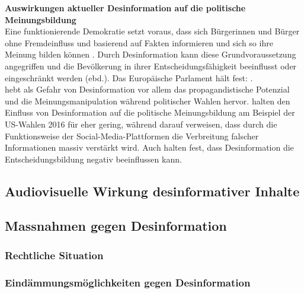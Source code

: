 \documentclass[12pt,a4paper]{article}        %
\begin{document}
\textbf{Auswirkungen aktueller Desinformation auf die politische Meinungsbildung}\\
Eine funktionierende Demokratie setzt voraus, dass sich Bürgerinnen und Bürger ohne Fremdeinfluss und basierend auf Fakten informieren und sich so ihre Meinung bilden können \parencite[26]{vogler_wahrnehmung_2021}. Durch Desinformation kann diese Grundvoraussetzung angegriffen und die Bevölkerung in ihrer Entscheidungsfähigkeit beeinflusst oder eingeschränkt werden (ebd.). Das Europäische Parlament hält fest:  \parencite[13]{european_parliament_directorate-general_for_external_policies_of_the_union_impact_2021} \parencites[vgl.\ auch][16]{reuter_fake_2019}[26]{vogler_wahrnehmung_2021}[19]{grujic_warnhinweise_2024}{schmidt_meinungsbildung_2022}. \\
\Textcite[170]{wahl_fake_2021} hebt als Gefahr von Desinformation vor allem das propagandistische Potenzial und die Meinungsmanipulation während politischer Wahlen hervor. \textcite{allcott_social_2017} halten den Einfluss von Desinformation auf die politische Meinungsbildung am Beispiel der US-Wahlen 2016 für eher gering, während \textcite[1095]{lazer_science_2018} darauf verweisen, dass durch die Funktionsweise der Social-Media-Plattformen die Verbreitung falscher Informationen massiv verstärkt wird. Auch \textcite[26]{vogler_wahrnehmung_2021} halten fest, dass Desinformation die Entscheidungsbildung negativ beeinflussen kann.


\subsection{Audiovisuelle Wirkung desinformativer Inhalte}
\subsection{Massnahmen gegen Desinformation}
\subsubsection{Rechtliche Situation}
\subsubsection{Eindämmungsmöglichkeiten gegen Desinformation}
\end{document}
